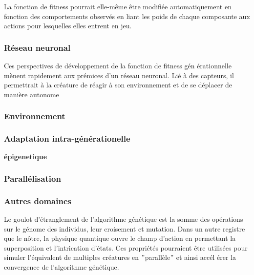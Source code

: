 \documentclass[journal, a4paper]{IEEEtran}
\begin{document}
	La fonction de fitness pourrait elle-même être modifiée
	automatiquement en fonction des comportements observés en liant
	les poids de chaque composante aux actions pour lesquelles elles
	entrent en jeu.
\subsubsection{Réseau neuronal}
	Ces perspectives de développement de la fonction de fitness gén
	érationnelle
	mènent rapidement aux prémices d'un réseau neuronal.
	Lié à des capteurs, il permettrait à la créature de réagir
	à son environnement et de se déplacer de manière autonome

\subsubsection{Environnement}

\subsubsection{Adaptation intra-générationelle}
	\textbf{épigenetique}
	\

\subsubsection{Parallélisation}

\subsubsection{Autres domaines}
	Le goulot d'étranglement de l'algorithme génétique est la somme
	des opérations sur le génome des individus, leur croisement et
	mutation.
	Dans un autre registre que le nôtre, la physique quantique ouvre le
	champ d'action en permettant la superposition et
	l'intrication
	d'états.
	Ces propriétés pourraient être utilisées pour simuler
	l'équivalent de multiples créatures en \("\)parallèle\("\) et ainsi accél
	érer la convergence
	de l'algorithme génétique.\cite{quantum-computing}
\end{document}
